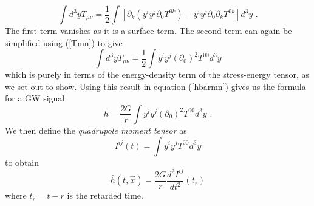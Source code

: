 \documentclass[11pt]{cuthesis}
\newcommand{\mn}{_{\mu\nu}}
\newcommand{\fs}{\text{ .}}
\begin{document}
\begin{equation}
\int d^3 y  T\mn = \frac{1}{2}\int [ \partial_k (y^i y^j \partial_0 T^{0k}) - y^i y^j \partial_0 \partial_k T^{0k} ] d^3 y \fs
\end{equation}
The first term vanishes as it is a surface term. The second term can again be simplified using (\ref{Tmn}) to give
\begin{equation}
\int d^3 y  T\mn = \frac{1}{2}\int y^i y^j (\partial_0)^2 T^{00}d^3 y
\end{equation}
which is purely in terms of the energy-density term of the stress-energy tensor, as we set out to show. Using this result in equation (\ref{hbarmn}) gives us the formula for a GW signal
\begin{equation}
\bar{h} = \frac{2G}{r} \int y^i y^j  (\partial_0)^2 T^{00}d^3 y \fs
\end{equation}
We then define the \textit{quadrupole moment tensor} as 
\begin{equation} \label{quad tensor}
I^{ij}(t) = \int y^i y^j T^{00}d^3 y
\end{equation}
to obtain
\begin{equation} \label{quad formula}
\bar{h}(t,\vec{x}) = \frac{2G}{r}\frac{d^2I^{ij}}{dt^2}(t_r)
\end{equation}
where $t_r=t-r$ is the retarded time. 
\end{document}
